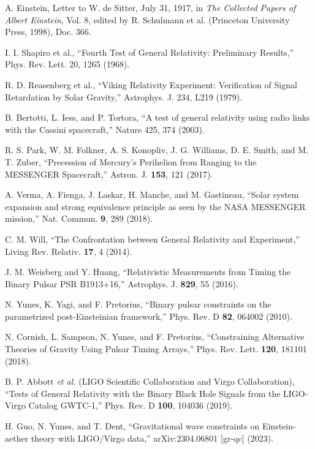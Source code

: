\documentclass{article}
\begin{document}
\begin{thebibliography}{9}
A. Einstein, Letter to W. de Sitter, July 31, 1917, in \textit{The Collected Papers of Albert Einstein}, Vol. 8, edited by R. Schulmann et al. (Princeton University Press, 1998), Doc. 366.

I. I. Shapiro et al., ``Fourth Test of General Relativity: Preliminary Results,'' Phys. Rev. Lett. 20, 1265 (1968).

R. D. Reasenberg et al., ``Viking Relativity Experiment: Verification of Signal Retardation by Solar Gravity,'' Astrophys. J. 234, L219 (1979).

B. Bertotti, L. Iess, and P. Tortora, ``A test of general relativity using radio links with the Cassini spacecraft,'' Nature 425, 374 (2003).

R. S. Park, W. M. Folkner, A. S. Konopliv, J. G. Williams, D. E. Smith, and M. T. Zuber, ``Precession of Mercury’s Perihelion from Ranging to the MESSENGER Spacecraft,'' Astron. J. \textbf{153}, 121 (2017).

A. Verma, A. Fienga, J. Laskar, H. Manche, and M. Gastineau, ``Solar system expansion and strong equivalence principle as seen by the NASA MESSENGER mission,'' Nat. Commun. \textbf{9}, 289 (2018).

C. M. Will, ``The Confrontation between General Relativity and Experiment,'' Living Rev. Relativ. \textbf{17}, 4 (2014).

J. M. Weisberg and Y. Huang, ``Relativistic Measurements from Timing the Binary Pulsar PSR B1913+16,'' Astrophys. J. \textbf{829}, 55 (2016).

N. Yunes, K. Yagi, and F. Pretorius, ``Binary pulsar constraints on the parametrized post-Einsteinian framework,'' Phys. Rev. D \textbf{82}, 064002 (2010).

N. Cornish, L. Sampson, N. Yunes, and F. Pretorius, ``Constraining Alternative Theories of Gravity Using Pulsar Timing Arrays,'' Phys. Rev. Lett. \textbf{120}, 181101 (2018).

B. P. Abbott \textit{et al.} (LIGO Scientific Collaboration and Virgo Collaboration), ``Tests of General Relativity with the Binary Black Hole Signals from the LIGO-Virgo Catalog GWTC-1,'' Phys. Rev. D \textbf{100}, 104036 (2019).

H. Guo, N. Yunes, and T. Dent, ``Gravitational wave constraints on Einstein-aether theory with LIGO/Virgo data,'' arXiv:2304.06801 [gr-qc] (2023).

\end{thebibliography}
\end{document}
